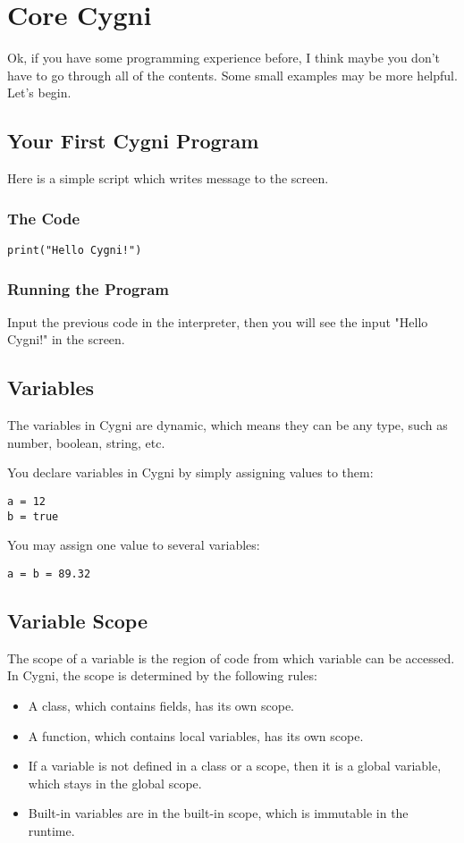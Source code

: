 \chapter{Core Cygni}
Ok, if you have some programming experience before, I think maybe you don't have to go through all of the contents. Some small examples may be more helpful. Let's begin.

\section{Your First Cygni Program}
Here is a simple script which writes message to the screen.

\subsection{The Code}
\begin{lstlisting}
print("Hello Cygni!")
\end{lstlisting}

\subsection{Running the Program}
Input the previous code in the interpreter, then you will see the input "Hello Cygni!" in the screen.
\section{Variables}
The variables in Cygni are dynamic, which means they can be any type, such as number, boolean, string, etc.

You declare variables in Cygni by simply assigning values to them:
\begin{lstlisting}
a = 12
b = true
\end{lstlisting}

You may assign one value to several variables:
\begin{lstlisting}
a = b = 89.32
\end{lstlisting}

\section{Variable Scope}
The scope of a variable is the region of code from which variable can be accessed. In Cygni, the scope is determined by the following rules:
\begin{itemize}
	\item A class, which contains fields, has its own scope.
	\item A function, which contains local variables, has its own scope.
	\item If a variable is not defined in a class or a scope, then it is a global variable, which stays in the global scope.
	\item Built-in variables are in the built-in scope, which is immutable in the runtime.
\end{itemize}

